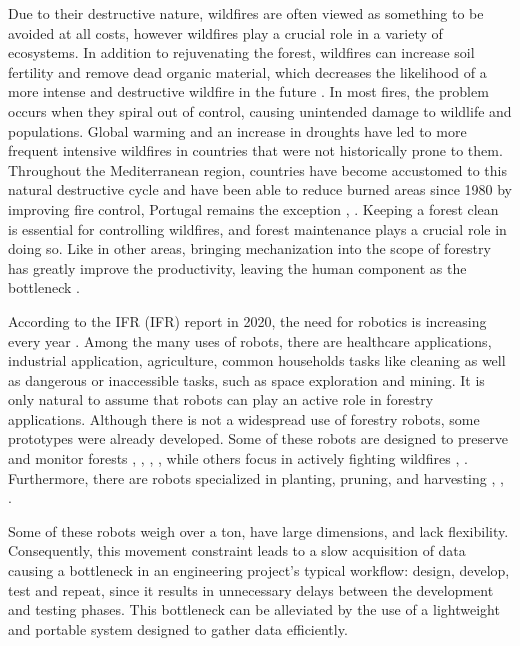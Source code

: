 Due to their destructive nature, wildfires are often viewed as something to be avoided at all costs, however wildfires play a crucial role in a variety of ecosystems. In addition to rejuvenating the forest, wildfires can increase soil fertility and remove dead organic material, which decreases the likelihood of a more intense and destructive wildfire in the future \cite{bond_fires_2017}. In most fires, the problem occurs when they spiral out of control, causing unintended damage to wildlife and populations. Global warming and an increase in droughts have led to more frequent intensive wildfires in countries that were not historically prone to them. Throughout the Mediterranean region, countries have become accustomed to this natural destructive cycle and have been able to reduce burned areas since 1980 by improving fire control, Portugal remains the exception \cite{turco_decreasing_2016}, \cite{european_commission_joint_research_centre_forest_2021}. Keeping a forest clean is essential for controlling wildfires, and forest maintenance plays a crucial role in doing so. Like in other areas, bringing mechanization into the scope of forestry has greatly improve the productivity, leaving the human component as the bottleneck \cite{parker_robotics_2016}.

According to the \acl{IFR} (\acs{IFR}) report in 2020, the need for robotics is increasing every year  \cite{IFR_robot_report_2020}. Among the many uses of robots, there are healthcare applications, industrial application, agriculture, common households tasks like cleaning as well as dangerous or inaccessible tasks, such as space exploration and mining. It is only natural to assume that robots can play an active role in forestry applications. Although there is not a widespread use of forestry robots, some prototypes were already developed.  Some of these robots are designed to preserve and monitor forests \cite{couceiro_semfire_2019}, \cite{jelavic_towards_2021}, \cite{lam_flexible_2011}, \cite{notomista_slothbot_2019}, while others focus in actively fighting wildfires \cite{noauthor_firefighting_2014}  \cite{hose_cartridge}, \cite{hydra}. Furthermore, there are robots specialized in planting, pruning, and harvesting \cite{noauthor_multiscope_nodate}, \cite{molina_aerial_2017}, \cite{zhang_rubber-tapping_2019}.

Some of these robots weigh over a ton, have large dimensions, and lack flexibility. Consequently, this movement constraint leads to a slow acquisition of data causing a bottleneck in an engineering project's typical workflow: design, develop, test and repeat, since it results in unnecessary delays between the development and testing phases. This bottleneck can be alleviated by the use of a lightweight and portable system designed to gather data efficiently.

